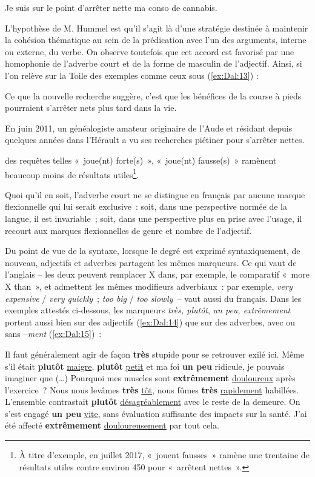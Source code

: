 \documentclass[output=paper]{langsci/langscibook}
\begin{document}
    \ex\label{ex:Dal:12b} Je suis sur le point d'arrêter nette ma conso de cannabis.
\z\z

L'hypothèse de M. Hummel est qu'il s'agit là d'une stratégie destinée à maintenir la cohésion thématique au sein de la prédication avec l'un des arguments, interne ou externe, du verbe. On observe toutefois que cet accord est favorisé par une homophonie de l'adverbe court et de la forme de masculin de l'adjectif. Ainsi, si l'on relève sur la Toile des exemples comme ceux sous (\ref{ex:Dal:13}) :

\ea\label{ex:Dal:13}
    \ea Ce que la nouvelle recherche suggère, c'est que les bénéfices de la course à pieds pourraient s'arrêter nets plus tard dans la vie.

    \ex En juin 2011, un généalogiste amateur originaire de l'Aude et résidant depuis quelques années dans l'Hérault a vu ses recherches piétiner pour s'arrêter nettes.
\z\z

des requêtes telles «~joue(nt) forte(s)~», «~joue(nt) fausse(s)~» ramènent beaucoup moins de résultats utiles\footnote{À titre d'exemple, en juillet 2017, «~jouent fausses~» ramène une trentaine de résultats utiles contre environ 450 pour «~arrêtent nettes~».}.

Quoi qu'il en soit, l'adverbe court ne se distingue en français par aucune marque flexionnelle qui lui serait exclusive~: soit, dans une perspective normée de la langue, il est invariable~; soit, dans une perspective plus en prise avec l'usage, il recourt aux marques flexionnelles de genre et nombre de l'adjectif.

Du point de vue de la syntaxe, lorsque le degré est exprimé syntaxiquement, de nouveau, adjectifs et adverbes partagent les mêmes marqueurs. Ce qui vaut de l'anglais -- les deux peuvent remplacer X dans, par exemple, le comparatif «~more X than~», et admettent les mêmes modifieurs adverbiaux~: par exemple, \emph{very expensive} / \emph{very quickly}~; \emph{too big} / \emph{too slowly}~-- vaut aussi du français. Dans les exemples attestés ci-dessous, les marqueurs \emph{très, plutôt}, \emph{un peu, extrêmement} portent aussi bien sur des adjectifs (\ref{ex:Dal:14}) que sur des adverbes, avec ou sans \emph{--ment} (\ref{ex:Dal:15})~:

\ea\label{ex:Dal:14}
    \ea Il faut généralement agir de façon \textbf{très} stupide pour se retrouver exilé ici.
    \ex Même s'il était \textbf{plutôt} \ul{maigre}, \textbf{plutôt} \ul{petit} et ma foi \textbf{un peu} ridicule, je pouvais imaginer que (\ldots{})
    \ex Pourquoi mes muscles sont \textbf{extrêmement} \ul{douloureux} après l'exercice~?
    \z
\ex\label{ex:Dal:15}
    \ea Nous nous levâmes \textbf{très} \ul{tôt}, nous fûmes \textbf{très} \ul{rapidement} habillées.
    \ex L'ensemble contrastait \textbf{plutôt} \ul{désagréablement} avec le reste de la demeure.
    \ex On s'est engagé \textbf{un peu} \ul{vite}, sans évaluation suffisante des impacts sur la santé.
    \ex J'ai été affecté \textbf{extrêmement} \ul{douloureusement} par tout cela.
\z\z
\end{document}

